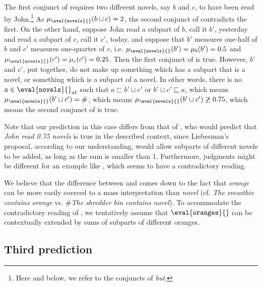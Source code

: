 \documentclass[output=paper]{langscibook}
\begin{document}
\noindent The first conjunct of  requires two different novels, say $b$ and $c$, to have been read by John.\footnote{Here and below, we refer to the conjuncts of \textit{but}.} As $\mu_{\eval{\texttt{novels}}{}}(b \sqcup c) = 2$, the second conjunct of  contradicts the first. On the other hand, suppose John read a subpart of $b$, call it $b'$, yesterday and read a subpart of $c$, call it $c'$, today, and suppose that $b'$ measures one-half of $b$ and $c'$ measures one-quarter of $c$, i.e. $\mu_{\eval{\texttt{novels}}{}}(b') = \mu_b(b') = 0.5$ and $\mu_{\eval{\texttt{novels}}{}}(c') = \mu_c(c') = 0.25$. Then the first conjunct of  is true. However, $b'$ and $c'$, put together, do not make up something which has a subpart that is a novel, or something which is a subpart of a novel. In other words, there is no $a \in \eval{\texttt{novels}}{}_{at}$ such that $a \sqsubset b' \sqcup c'$ or $b' \sqcup c' \sqsubseteq a$, which means $\mu_{\eval{\texttt{novels}}{}}(b' \sqcup c') = \#$, which means $\mu_{\eval{\texttt{novels}}{}}(b' \sqcup c') \not\geq 0.75$, which means the second conjunct of  is true.

Note that our prediction in this case differs from that of \citet{liebesman2016counting}, who would predict that \textit{John read 0.75 novels} is true in the described context, since Liebesman's proposal, according to our understanding, would allow subparts of different novels to be added, as long as the sum is smaller than 1. Furthermore, judgments might be different for an example like , which seems to have a contradictory reading.

\label{hai-tri:orange}
\z

\noindent We believe that the difference between  and  comes down to the fact that \textit{orange} can be more easily coerced to a mass interpretation than \textit{novel} (cf. \textit{The smoothie contains orange} vs. \#\textit{The shredder bin contains novel}). To accommodate the contradictory reading of , we tentatively assume that $\eval{\texttt{oranges}}{}$ can be contextually extended by sums of subparts of different oranges.

\subsection{Third prediction} 
\end{document}
